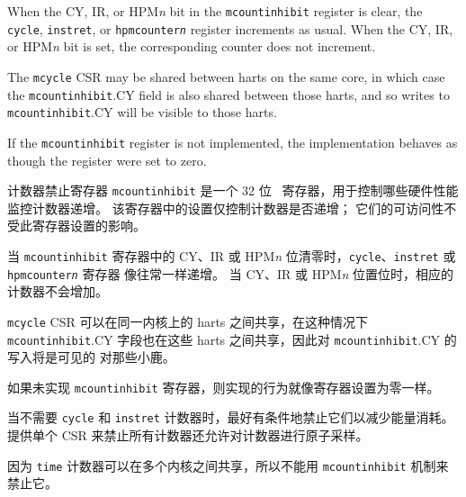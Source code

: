 When the CY, IR, or HPM{\em n} bit in the {\tt mcountinhibit} register is
clear, the {\tt cycle}, {\tt instret}, or {\tt hpmcounter{\em n}} register
increments as usual.  When the CY, IR, or HPM{\em n} bit is set, the
corresponding counter does not increment.

The {\tt mcycle} CSR may be shared between harts on the same core, in which
case the {\tt mcountinhibit}.CY field is also shared between those harts,
and so writes to {\tt mcountinhibit}.CY will be visible to those harts.

If the {\tt mcountinhibit} register is not implemented, the implementation
behaves as though the register were set to zero.
\fi

计数器禁止寄存器 {\tt mcountinhibit} 是一个 32 位 \warl\ 寄存器，用于控制哪些硬件性能监控计数器递增。 该寄存器中的设置仅控制计数器是否递增； 它们的可访问性不受此寄存器设置的影响。

当 {\tt mcountinhibit} 寄存器中的 CY、IR 或 HPM{\em n} 位清零时，{\tt cycle}、{\tt instret} 或 {\tt hpmcounter{\em n}} 寄存器 像往常一样递增。 当 CY、IR 或 HPM{\em n} 位置位时，相应的计数器不会增加。

{\tt mcycle} CSR 可以在同一内核上的 harts 之间共享，在这种情况下 {\tt mcountinhibit}.CY 字段也在这些 harts 之间共享，因此对 {\tt mcountinhibit}.CY 的写入将是可见的 对那些小鹿。

如果未实现 {\tt mcountinhibit} 寄存器，则实现的行为就像寄存器设置为零一样。

\iffalse
\begin{commentary}
When the {\tt cycle} and {\tt instret} counters are not needed, it is
desirable to conditionally inhibit them to reduce energy consumption.
Providing a single CSR to inhibit all counters also allows the counters to be
atomically sampled.

Because the {\tt time} counter can be shared between multiple cores, it
cannot be inhibited with the {\tt mcountinhibit} mechanism.
\end{commentary}
\fi

\begin{commentary}
当不需要 {\tt cycle} 和 {\tt instret} 计数器时，最好有条件地禁止它们以减少能量消耗。 提供单个 CSR 来禁止所有计数器还允许对计数器进行原子采样。

因为 {\tt time} 计数器可以在多个内核之间共享，所以不能用 {\tt mcountinhibit} 机制来禁止它。
\end{commentary}


